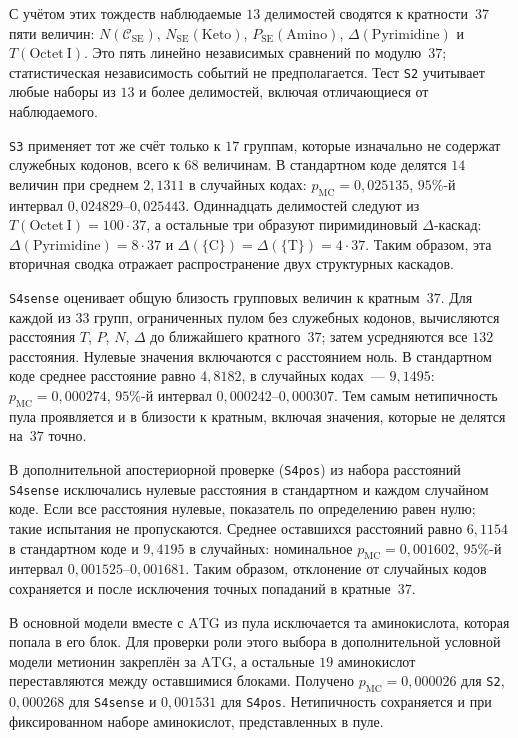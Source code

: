 \documentclass[11pt,a4paper]{article}
\renewcommand{\_}{\origunderscore\allowbreak}
\begin{document}
С учётом этих тождеств наблюдаемые $13$ делимостей сводятся
к кратности~$37$ пяти величин: $N(\mathcal{C}_{\mathrm{SE}})$,
$N_{\mathrm{SE}}(\mathrm{Keto})$, $P_{\mathrm{SE}}(\mathrm{Amino})$,
$\Delta(\mathrm{Pyrimidine})$ и $T(\mathrm{Octet~I})$.
Это пять линейно независимых сравнений по модулю~$37$;
статистическая независимость событий не предполагается.
Тест \texttt{S2} учитывает любые наборы из $13$ и более делимостей,
включая отличающиеся от наблюдаемого.

\texttt{S3} применяет тот же счёт только к $17$ группам,
которые изначально не содержат служебных кодонов, всего к $68$
величинам. В стандартном коде делятся $14$ величин при среднем
$2{,}1311$ в случайных кодах:
$p_{\mathrm{MC}} = 0{,}025135$,
$95\%$-й интервал $0{,}024829$--$0{,}025443$.
Одиннадцать делимостей следуют из
$T(\mathrm{Octet~I}) = 100 \cdot 37$, а остальные три образуют
пиримидиновый $\Delta$-каскад:
$\Delta(\mathrm{Pyrimidine}) = 8 \cdot 37$ и
$\Delta(\{\mathrm{C}\}) = \Delta(\{\mathrm{T}\}) = 4 \cdot 37$.
Таким образом, эта вторичная сводка отражает распространение
двух структурных каскадов.

\texttt{S4sense} оценивает общую близость групповых величин
к кратным~$37$. Для каждой из $33$ групп, ограниченных пулом
без служебных кодонов, вычисляются расстояния $T$, $P$, $N$,
$\Delta$ до ближайшего кратного~$37$; затем усредняются все
$132$ расстояния. Нулевые значения включаются с расстоянием
ноль. В стандартном коде среднее расстояние равно $4{,}8182$,
в случайных кодах~--- $9{,}1495$:
$p_{\mathrm{MC}} = 0{,}000274$,
$95\%$-й интервал $0{,}000242$--$0{,}000307$.
Тем самым нетипичность пула проявляется и в близости к кратным,
включая значения, которые не делятся на~$37$ точно.

В дополнительной апостериорной проверке (\texttt{S4pos})
из набора расстояний \texttt{S4sense} исключались нулевые
расстояния в стандартном и каждом случайном коде. Если все
расстояния нулевые, показатель по определению равен нулю;
такие испытания не пропускаются. Среднее оставшихся расстояний
равно $6{,}1154$ в стандартном коде и $9{,}4195$ в случайных:
номинальное $p_{\mathrm{MC}} = 0{,}001602$, $95\%$-й интервал
$0{,}001525$--$0{,}001681$.
Таким образом, отклонение от случайных кодов сохраняется
и после исключения точных попаданий в кратные~$37$.

В основной модели вместе с $\mathrm{ATG}$ из пула исключается
та аминокислота, которая попала в его блок. Для проверки роли
этого выбора в дополнительной условной модели метионин закреплён
за $\mathrm{ATG}$, а остальные $19$ аминокислот переставляются
между оставшимися блоками. Получено
$p_{\mathrm{MC}} = 0{,}000026$ для \texttt{S2},
$0{,}000268$ для \texttt{S4sense} и $0{,}001531$ для
\texttt{S4pos}. Нетипичность сохраняется и при фиксированном
наборе аминокислот, представленных в пуле.
\end{document}
